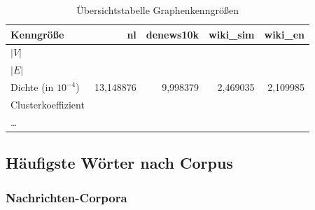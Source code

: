 \documentclass[11pt, a4paper]{article}
\begin{document}
\begin{table}

    \begin{tabular}{l*{4}{r}}
    \toprule
    Kenngröße & nl & denews10k & wiki\_sim & wiki\_en \\
    \midrule
    $|V|$     &       &       &       &       \\
    $|E|$     &       &       &       &       \\
    Dichte (in $10^{-4}$) & 13,148876 & 9,998379 & 2,469035 & 2,109985 \\
    Clusterkoeffizient &       &       &       &       \\
    \dots     &       &       &       &       \\
    \bottomrule
    \end{tabular}
    \caption{Übersichtstabelle Graphenkenngrößen}
\end{table}

\subsection{H\"aufigste W\"orter nach Corpus}

\subsubsection{Nachrichten-Corpora}
\end{document}
